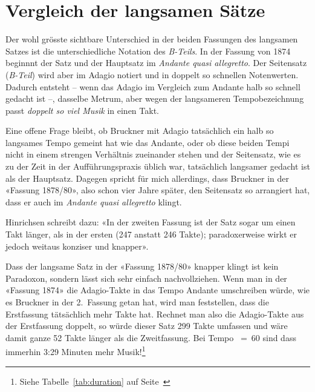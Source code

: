 \section{Vergleich der langsamen Sätze}

Der wohl grösste sichtbare Unterschied in der beiden Fassungen des langsamen Satzes ist die unterschiedliche Notation des \emph{B-Teils}.
In der Fassung von 1874 beginnnt der Satz und der Hauptsatz im \emph{Andante quasi allegretto}.
Der Seitensatz (\emph{B-Teil}) wird aber im Adagio notiert und in doppelt so schnellen Notenwerten.
Dadurch entsteht -- wenn das Adagio im Vergleich zum Andante halb so schnell gedacht ist --, dasselbe Metrum, aber wegen der langsameren Tempobezeichnung passt \emph{doppelt so viel Musik} in einen Takt.

Eine offene Frage bleibt, ob Bruckner mit Adagio tatsächlich ein halb so langsames Tempo gemeint hat wie das Andante, oder ob diese beiden Tempi nicht in einem strengen Verhältnis zueinander stehen und der Seitensatz, wie es zu der Zeit in der Aufführungspraxis üblich war, tatsächlich langsamer gedacht ist als der Hauptsatz.
Dagegen spricht für mich allerdings, dass Bruckner in der «Fassung 1878/80», also schon vier Jahre später, den Seitensatz so arrangiert hat, dass er auch im \emph{Andante quasi allegretto} klingt.

Hinrichsen schreibt dazu: «In der zweiten Fassung ist der Satz sogar um einen Takt länger, als in der ersten (247 anstatt 246 Takte); paradoxerweise wirkt er jedoch weitaus konziser und knapper»\autocite[76]{hinrichsen:bruckner}.

Dass der langsame Satz in der «Fassung 1878/80» knapper klingt ist kein Paradoxon, sondern lässt sich sehr einfach nachvollziehen.
Wenn man in der «Fassung 1874» die Adagio-Takte in das Tempo Andante umschreiben würde, wie es Bruckner in der 2.~Fassung getan hat, wird man feststellen, dass die Erstfassung tätsächlich mehr Takte hat.
Rechnet man also die Adagio-Takte aus der Erstfassung doppelt, so würde dieser Satz 299 Takte umfassen und wäre damit ganze 52 Takte länger als die Zweitfassung.
Bei Tempo \quarternote~=~60 sind dass immerhin 3:29 Minuten mehr Musik!\footnote{Siehe Tabelle~\ref{tab:duration} auf Seite~\pageref{tab:duration}}

